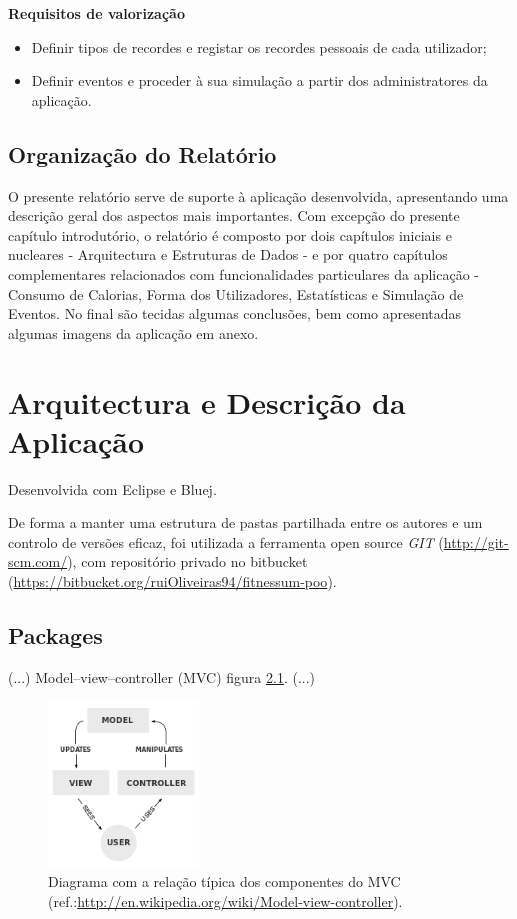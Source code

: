 \documentclass[a4paper,10pt]{report}
\begin{document}
\textbf{Requisitos de valorização}
\begin{itemize}
\item Definir tipos de recordes e registar os recordes pessoais de cada utilizador;
\item Definir eventos e proceder à sua simulação a partir dos administratores da aplicação.
\end{itemize}

\section{Organização do Relatório}
\label{sec:org}
O presente relatório serve de suporte à aplicação desenvolvida, apresentando uma descrição geral dos aspectos mais importantes.
Com excepção do presente capítulo introdutório, o relatório é composto por dois capítulos iniciais e nucleares  - Arquitectura e 
Estruturas de Dados - e por quatro capítulos complementares relacionados com funcionalidades particulares da aplicação - Consumo de Calorias, 
Forma dos Utilizadores, Estatísticas e Simulação de Eventos. No final são tecidas algumas conclusões, bem como apresentadas algumas imagens da
aplicação em anexo.

\chapter{Arquitectura e Descrição da Aplicação}
\label{cap:arq}

Desenvolvida com Eclipse e Bluej.

De forma a manter uma estrutura de pastas partilhada entre os autores e um controlo de versões eficaz, 
foi utilizada a ferramenta open source \emph{GIT} (\url{http://git-scm.com/}), 
com repositório privado no bitbucket (\url{https://bitbucket.org/ruiOliveiras94/fitnessum-poo}).


\section{Packages}
\label{sec:packages}
(...)
Model–view–controller (MVC) figura \ref{fig:mvc}.
(...)
\begin{figure}
\centering
\includegraphics[width=4cm]{MVC-Process.png}
\caption{Diagrama com a relação típica dos componentes do MVC (ref.:\url{http://en.wikipedia.org/wiki/Model-view-controller}).}
\label{fig:mvc}
\end{figure}
\end{document}
